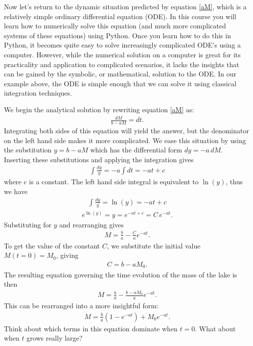 \documentclass[11pt, oneside]{article}   	%
\begin{document}
Now let's return to the dynamic situation predicted by equation \ref{aM}, which is a relatively simple  ordinary differential equation (ODE).  In this course you will learn how to numerically solve this equation (and much more complicated systems of these equations)  using Python.  Once you learn how to do this in Python, it becomes quite easy to solve increasingly complicated ODE's using a computer.  However, while the numerical solution on a computer is great for its practicality and application to complicated scenarios, it lacks the  insights that can be gained by the symbolic, or mathematical, solution to the ODE. In our example above, the ODE is simple enough that we can solve it using classical integration techniques. 

We begin the analytical solution by rewriting equation \ref{aM} as:
\begin{eqnarray}
\frac{dM}{ b - a M}= dt.
\end{eqnarray}
Integrating both sides of this equation will yield the answer, but the denominator on the left hand side makes it more complicated. We ease this situation by using the substitution $y = b- aM$ which has the differential form $dy = - a\, dM$. Inserting these substitutions and applying the integration gives
\begin{eqnarray}
\int  \frac{dy}{ y} = - a\int dt  = -at + c
\end{eqnarray}
where c is a constant.
The left hand side integral is equivalent to $\ln(y)$, thus we have
\begin{eqnarray}
\int  \frac{dy}{ y} = \ln(y) = -at + c
\end{eqnarray}
\begin{eqnarray}
e^ {\ln(y)} = y =  e^{-at+c} = C\, e^{-at}.
\end{eqnarray} 
Substituting for $y$ and rearranging gives
\begin{eqnarray}
M = \frac{b}{a} - \frac{C}{a} e^{-at}.
\end{eqnarray} 
To get the value of the constant $C$, we  substitute the initial value $M(t=0) = M_0$, giving 
\begin{eqnarray}
C = b - a M_0. 
 \end{eqnarray} 
The resulting equation governing the time evolution of the mass of the lake is then
\begin{eqnarray}
M = \frac{b}{a} - \frac{b - a M_0}{a} e^{-at}.
\end{eqnarray} 
This can be rearranged into a more insightful form:
\begin{eqnarray}
M = \frac{b}{a} (1- e^{-at}) +   M_0 e^{-at}.
\end{eqnarray} 
Think about which terms in this equation dominate when $t=0$. What about when $t$ grows really large?
 
\end{document}
